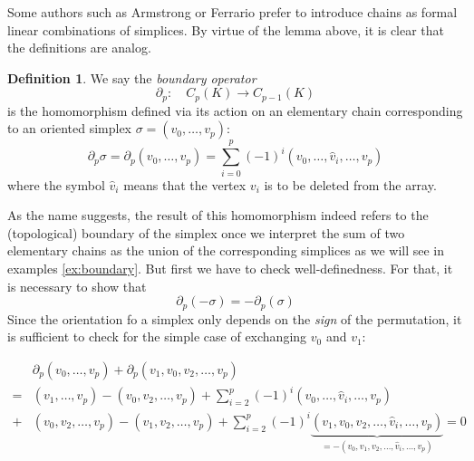 \documentclass[toc=bib, headinclude]{scrartcl}
\theoremstyle{plain}
\theoremstyle{definition}
\newtheorem	{definition}[theorem]{Definition}
\theoremstyle{remark}
\begin{document}
Some authors such as Armstrong \parencite[p.176f]{ar} or Ferrario \parencite[p.60]{fe} prefer to introduce chains as formal linear combinations of simplices. By virtue of the lemma above, it is clear that the definitions are analog.

\begin{definition}
	We say the \textit{boundary operator} 
	\[
	\partial_p:\quad C_p(K)\to C_{p-1}(K)
	\]
	is the homomorphism defined via its action on an elementary chain corresponding to an oriented simplex $\sigma=(v_0,\dots,v_p)$:
	\[
	\partial_p\sigma=\partial_p(v_0,\dots,v_p)=\sum_{i=0}^{p}(-1)^i(v_0,\dots,\hat{v}_i,\dots,v_p)
	\]
	where the symbol $\hat{v}_i$ means that the vertex $v_i$ is to be deleted from the array.
\end{definition}

As the name suggests, the result of this homomorphism indeed refers to the (topological) boundary of the simplex once we interpret the sum of two elementary chains as the union of the corresponding simplices as we will see in examples \ref{ex:boundary}. But first we have to check well-definedness. For that, it is necessary to show that
\[\partial_p(-\sigma)=-\partial_p(\sigma) 
\]
Since the orientation fo a simplex only depends on the \emph{sign} of the permutation, it is sufficient to check for the simple case of exchanging $v_0$ and $v_1$:

\begin{align*}
	&\partial_p(v_0,\dots,v_p)+\partial_p(v_1,v_0,v_2,\dots,v_p)\\
	=&(v_1,\dots,v_p)-(v_0,v_2,\dots,v_p)+\sum_{i=2}^{p}(-1)^i(v_0,\dots,\hat{v}_i,\dots,v_p)\\
	+&(v_0,v_2,\dots,v_p)-(v_1,v_2,\dots,v_p)+\sum_{i=2}^p(-1)^i\underset{=-(v_0,v_1,v_2,\dots,\hat{v}_i,\dots,v_p)}{\underbrace{\ensuremath{(v_1,v_0,v_2,\dots,\hat{v}_i,\dots,v_p)}}}=0
\end{align*}
\end{document}
